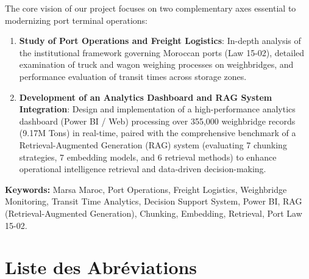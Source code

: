 \documentclass[12pt,a4paper,oneside]{report}
\begin{document}
The core vision of our project focuses on two complementary axes essential to modernizing port terminal operations:
\begin{enumerate}
    \item \textbf{Study of Port Operations and Freight Logistics}: In-depth analysis of the institutional framework governing Moroccan ports (Law 15-02), detailed examination of truck and wagon weighing processes on weighbridges, and performance evaluation of transit times across storage zones.
    \item \textbf{Development of an Analytics Dashboard and RAG System Integration}: Design and implementation of a high-performance analytics dashboard (Power BI / Web) processing over 355,000 weighbridge records (9.17M Tons) in real-time, paired with the comprehensive benchmark of a Retrieval-Augmented Generation (RAG) system (evaluating 7 chunking strategies, 7 embedding models, and 6 retrieval methods) to enhance operational intelligence retrieval and data-driven decision-making.
\end{enumerate}

\textbf{Keywords:} Marsa Maroc, Port Operations, Freight Logistics, Weighbridge Monitoring, Transit Time Analytics, Decision Support System, Power BI, RAG (Retrieval-Augmented Generation), Chunking, Embedding, Retrieval, Port Law 15-02.

\newpage

\tableofcontents
\newpage
\listoffigures
\listoftables
\newpage

\chapter*{Liste des Abréviations}
\end{document}
